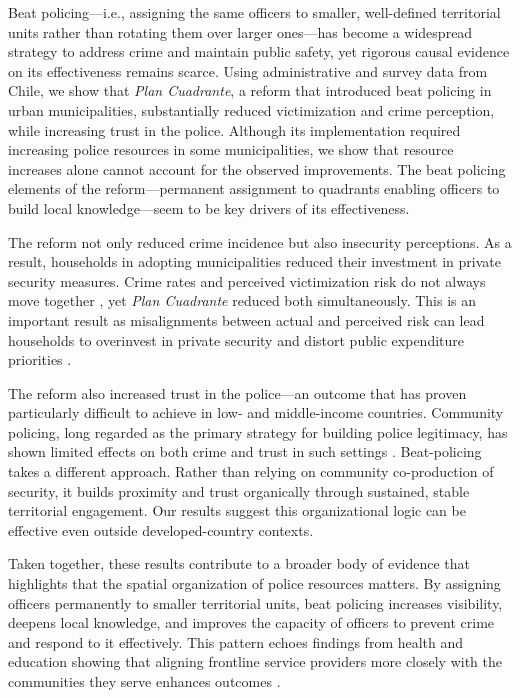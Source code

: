 Beat policing---i.e., assigning the same officers to smaller, well-defined territorial units rather than rotating them over larger ones---has become a widespread strategy to address crime and maintain public safety, yet rigorous causal evidence on its effectiveness remains scarce. Using administrative and survey data from Chile, we show that \emph{Plan Cuadrante}, a reform that introduced beat policing in urban municipalities, substantially reduced victimization and crime perception, while increasing trust in the police. Although its implementation required increasing police resources in some municipalities, we show that resource increases alone cannot account for the observed improvements. The beat policing elements of the reform---permanent assignment to quadrants enabling officers to build local knowledge---seem to be key drivers of its effectiveness.

The reform not only reduced crime incidence but also insecurity perceptions. As a result, households in adopting municipalities reduced their investment in private security measures. Crime rates and perceived victimization risk do not always move together \citep{Ajzenman_Pato}, yet \emph{Plan Cuadrante} reduced both simultaneously. This is an important result as misalignments between actual and perceived risk can lead households to overinvest in private security and distort public expenditure priorities \citep{Minali, Ajzenman_Pato}.

The reform also increased trust in the police---an outcome that has proven particularly difficult to achieve in low- and middle-income countries. Community policing, long regarded as the primary strategy for building police legitimacy, has shown limited effects on both crime and trust in such settings \citep{blair2021, Tobon}. Beat-policing takes a different approach. Rather than relying on community co-production of security, it builds proximity and trust organically through sustained, stable territorial engagement. Our results suggest this organizational logic can be effective even outside developed-country contexts.

Taken together, these results contribute to a broader body of evidence that highlights that the spatial organization of police resources matters. By assigning officers permanently to smaller territorial units, beat policing increases visibility, deepens local knowledge, and improves the capacity of officers to prevent crime and respond to it effectively. This pattern echoes findings from health and education showing that aligning frontline service providers more closely with the communities they serve enhances outcomes \citep{besley2003centralized, Bardhan, Bloom_2015, Basurto}.

